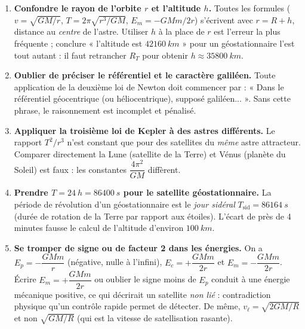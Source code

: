 \documentclass[11pt]{article}
\newcounter{popsec}
\newcounter{popsub}
\newcommand{\courssub}[1]{%
  \stepcounter{popsub}%
  \par\vspace{9pt}\noindent{\popxbold\fontsize{11.5}{13}\selectfont\color{popink}{\color{poporange}\thepopsec.\thepopsub}\hspace{6pt}#1}\par\nopagebreak\vspace{4pt}
}
\begin{document}
\begin{attention}
\begin{enumerate}
\item \textbf{Confondre le rayon de l'orbite $r$ et l'altitude $h$.} Toutes les formules ($v = \sqrt{GM/r}$, $T = 2\pi\sqrt{r^3/GM}$, $E_m = -GMm/2r$) s'écrivent avec $r = R + h$, distance au \emph{centre} de l'astre. Utiliser $h$ à la place de $r$ est l'erreur la plus fréquente ; conclure « l'altitude est $\SI{42160}{km}$ » pour un géostationnaire l'est tout autant : il faut retrancher $R_T$ pour obtenir $h \approx \SI{35800}{km}$.
\item \textbf{Oublier de préciser le référentiel et le caractère galiléen.} Toute application de la deuxième loi de Newton doit commencer par : « Dans le référentiel géocentrique (ou héliocentrique), supposé galiléen... ». Sans cette phrase, le raisonnement est incomplet et pénalisé.
\item \textbf{Appliquer la troisième loi de Kepler à des astres différents.} Le rapport $T^2/r^3$ n'est constant que pour des satellites du \emph{même} astre attracteur. Comparer directement la Lune (satellite de la Terre) et Vénus (planète du Soleil) est faux : les constantes $\dfrac{4\pi^2}{GM}$ diffèrent.
\item \textbf{Prendre $T = \SI{24}{h} = \SI{86400}{s}$ pour le satellite géostationnaire.} La période de révolution d'un géostationnaire est le \emph{jour sidéral} $T_{\text{sid}} = \SI{86164}{s}$ (durée de rotation de la Terre par rapport aux étoiles). L'écart de près de 4 minutes fausse le calcul de l'altitude d'environ $\SI{100}{km}$.
\item \textbf{Se tromper de signe ou de facteur 2 dans les énergies.} On a $E_p = -\dfrac{GMm}{r}$ (négative, nulle à l'infini), $E_c = +\dfrac{GMm}{2r}$ et $E_m = -\dfrac{GMm}{2r}$. Écrire $E_m = +\dfrac{GMm}{2r}$ ou oublier le signe moins de $E_p$ conduit à une énergie mécanique positive, ce qui décrirait un satellite \emph{non lié} : contradiction physique qu'un contrôle rapide permet de détecter. De même, $v_\ell = \sqrt{2GM/R}$ et non $\sqrt{GM/R}$ (qui est la vitesse de satellisation rasante).
\end{enumerate}
\end{attention}

\courssub{Exercices d'entraînement}
\end{document}
